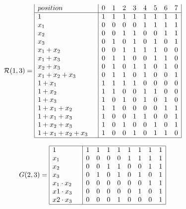 \documentclass{beamer}
\newcommand{\RM}[2]{\ensuremath{\mathcal{R}(#1,#2)}}
\begin{document}
\begin{frame}
 \begin{equation}

\RM{1}{3} = \begin{array}{|l|cccccccc|}
  position &     0&1&2&3&4&5&6&7 \\
\hline
1 \quad&  	 1&1&1&1&1&1&1&1 \\
x_1 \quad& 	 0&0&0&0&1&1&1&1 \\
x_2 \quad& 	 0&0&1&1&0&0&1&1 \\
x_3 \quad&	 0&1&0&1&0&1&0&1 \\
x_1+x_2 \quad&    0&0&1&1&1&1&0&0 \\
x_1+x_3 \quad&	 0&1&1&0&0&1&1&0 \\
x_2+x_3 \quad&	 0&1&0&1&1&0&1&0 \\
x_1+x_2+x_3 \quad& 0&1&1&0&1&0&0&1 \\
1+x_1	\quad&	 1&1&1&1&0&0&0&0 \\
1+x_2	\quad&	 1&1&0&0&1&1&0&0 \\
1+x_3	\quad&	 1&0&1&0&1&0&1&0 \\
1+x_1+x_2 \quad&	 1&1&0&0&0&0&1&1 \\
1+x_1+x_3 \quad&	 1&0&0&1&1&0&0&1 \\
1+x_2+x_3 \quad&	 1&0&1&0&0&1&0&1 \\
1+x_1+x_2+x_3\quad& 1&0&0&1&0&1&1&0 \\
\hline
\end{array}
\end{equation}
\end{frame}


\begin{frame}
 \begin{equation}
G(2,3) =\begin{array}{|l|cccccccc|}
\hline
1 \quad&         1&1&1&1&1&1&1&1 \\
x_1 \quad&       0&0&0&0&1&1&1&1 \\
x_2 \quad&       0&0&1&1&0&0&1&1 \\
x_3 \quad&       0&1&0&1&0&1&0&1 \\
x_1\cdot x_2 \quad& 0&0&0&0&0&0&1&1 \\ 
x1\cdot x_3 \quad& 0&0&0&0&0&1&0&1 \\
x2\cdot x_3 \quad& 0&0&0&1&0&0&0&1 \\
\hline
\end{array}
\end{equation}
\end{frame}
\end{document}
